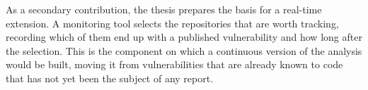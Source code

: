 As a secondary contribution, the thesis prepares the basis for a real-time extension. A
monitoring tool selects the repositories that are worth tracking, 
recording which of them end up with a published vulnerability and how long after
the selection. This is the component on which a continuous version of the analysis would
be built, moving it from vulnerabilities that are already known to code that has not yet been the
subject of any report.
